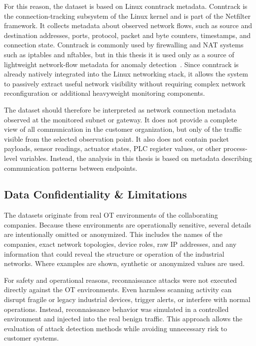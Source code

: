 For this reason, the dataset is based on Linux conntrack metadata. Conntrack is the connection-tracking subsystem of the Linux kernel and is part of the Netfilter framework. It collects metadata about observed network flows, such as source and destination addresses, ports, protocol, packet and byte counters, timestamps, and connection state. Conntrack is commonly used by firewalling and NAT systems such as iptables and nftables, but in this thesis it is used only as a source of lightweight network-flow metadata for anomaly detection~\cite{neira2006conntrack,netfilter_nftables_2025}. Since conntrack is already natively integrated into the Linux networking stack, it allows the system to passively extract useful network visibility without requiring complex network reconfiguration or additional heavyweight monitoring components.

The dataset should therefore be interpreted as network connection metadata observed at the monitored subnet or gateway. It does not provide a complete view of all communication in the customer organization, but only of the traffic visible from the selected observation point. It also does not contain packet payloads, sensor readings, actuator states, PLC register values, or other process-level variables. Instead, the analysis in this thesis is based on metadata describing communication patterns between endpoints.



\subsection{Data Confidentiality \& Limitations}
\label{sec:data_lim_conf}

The datasets originate from real OT environments of the collaborating companies. Because these environments are operationally sensitive, several details are intentionally omitted or anonymized. This includes the names of the companies, exact network topologies, device roles, raw IP addresses, and any information that could reveal the structure or operation of the industrial networks. Where examples are shown, synthetic or anonymized values are used.


For safety and operational reasons, reconnaissance attacks were not executed directly against the OT environments. Even harmless scanning activity can disrupt fragile or legacy industrial devices, trigger alerts, or interfere with normal operations. Instead, reconnaissance behavior was simulated in a controlled environment and injected into the real benign traffic. This approach allows the evaluation of attack detection methods while avoiding unnecessary risk to customer systems.
